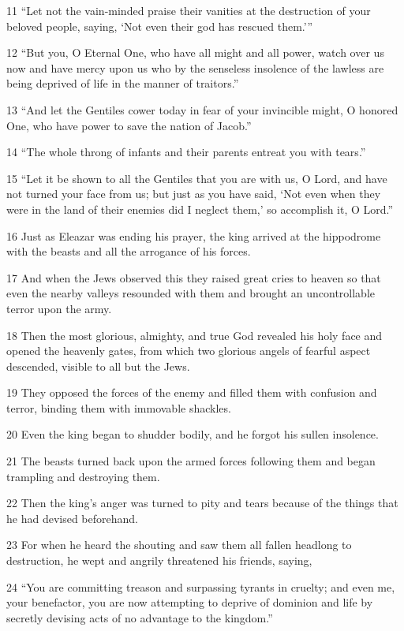 \par 11 “Let not the vain-minded praise their vanities at the destruction of your beloved people, saying, ‘Not even their god has rescued them.’”
\par 12 “But you, O Eternal One, who have all might and all power, watch over us now and have mercy upon us who by the senseless insolence of the lawless are being deprived of life in the manner of traitors.”
\par 13 “And let the Gentiles cower today in fear of your invincible might, O honored One, who have power to save the nation of Jacob.”
\par 14 “The whole throng of infants and their parents entreat you with tears.”
\par 15 “Let it be shown to all the Gentiles that you are with us, O Lord, and have not turned your face from us; but just as you have said, ‘Not even when they were in the land of their enemies did I neglect them,’ so accomplish it, O Lord.”
\par 16 Just as Eleazar was ending his prayer, the king arrived at the hippodrome with the beasts and all the arrogance of his forces.
\par 17 And when the Jews observed this they raised great cries to heaven so that even the nearby valleys resounded with them and brought an uncontrollable terror upon the army.
\par 18 Then the most glorious, almighty, and true God revealed his holy face and opened the heavenly gates, from which two glorious angels of fearful aspect descended, visible to all but the Jews.
\par 19 They opposed the forces of the enemy and filled them with confusion and terror, binding them with immovable shackles.
\par 20 Even the king began to shudder bodily, and he forgot his sullen insolence.
\par 21 The beasts turned back upon the armed forces following them and began trampling and destroying them.
\par 22 Then the king's anger was turned to pity and tears because of the things that he had devised beforehand.
\par 23 For when he heard the shouting and saw them all fallen headlong to destruction, he wept and angrily threatened his friends, saying,
\par 24 “You are committing treason and surpassing tyrants in cruelty; and even me, your benefactor, you are now attempting to deprive of dominion and life by secretly devising acts of no advantage to the kingdom.”
